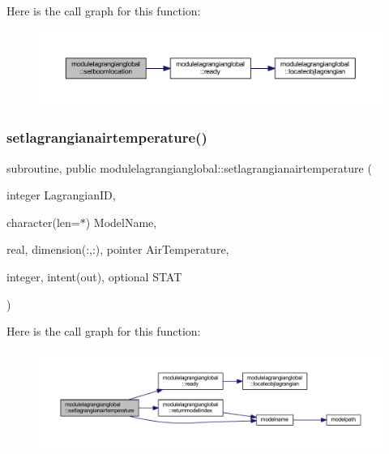 Here is the call graph for this function\+:\nopagebreak
\begin{figure}[H]
\begin{center}
\leavevmode
\includegraphics[width=350pt]{namespacemodulelagrangianglobal_a026e5461ba329b59c22df0570d3c4cd4_cgraph}
\end{center}
\end{figure}
\mbox{\label{namespacemodulelagrangianglobal_ae5f676580934f8f401128b976eca5807}} 
\subsubsection{\texorpdfstring{setlagrangianairtemperature()}{setlagrangianairtemperature()}}
{\footnotesize\ttfamily subroutine, public modulelagrangianglobal\+::setlagrangianairtemperature (\begin{DoxyParamCaption}\item[{integer}]{Lagrangian\+ID,  }\item[{character(len=$\ast$)}]{Model\+Name,  }\item[{real, dimension(\+:,\+:), pointer}]{Air\+Temperature,  }\item[{integer, intent(out), optional}]{S\+T\+AT }\end{DoxyParamCaption})}

Here is the call graph for this function\+:\nopagebreak
\begin{figure}[H]
\begin{center}
\leavevmode
\includegraphics[width=350pt]{namespacemodulelagrangianglobal_ae5f676580934f8f401128b976eca5807_cgraph}
\end{center}
\end{figure}
\mbox{\label{namespacemodulelagrangianglobal_a98a63aa4ad8e0057fcd9682992e94c72}} 
